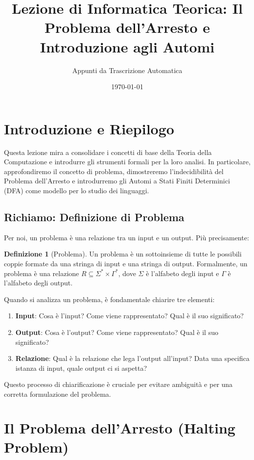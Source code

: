 \documentclass[a4paper]{article}
\title{Lezione di Informatica Teorica: Il Problema dell'Arresto e Introduzione agli Automi}
\author{Appunti da Trascrizione Automatica}
\date{\today}
\theoremstyle{definition} %
\newtheorem{definition}{Definizione}
\begin{document}
\maketitle
\tableofcontents
\newpage

\section{Introduzione e Riepilogo}

Questa lezione mira a consolidare i concetti di base della Teoria della Computazione e introdurre gli strumenti formali per la loro analisi. In particolare, approfondiremo il concetto di problema, dimostreremo l'indecidibilità del Problema dell'Arresto e introdurremo gli Automi a Stati Finiti Determinici (DFA) come modello per lo studio dei linguaggi.

\subsection{Richiamo: Definizione di Problema}

Per noi, un problema è una relazione tra un input e un output. Più precisamente:

\begin{definition}[Problema]
Un problema è un sottoinsieme di tutte le possibili coppie formate da una stringa di input e una stringa di output.
Formalmente, un problema è una relazione $R \subseteq \Sigma^* \times \Gamma^*$, dove $\Sigma$ è l'alfabeto degli input e $\Gamma$ è l'alfabeto degli output.
\end{definition}

Quando si analizza un problema, è fondamentale chiarire tre elementi:
\begin{enumerate}
    \item \textbf{Input}: Cosa è l'input? Come viene rappresentato? Qual è il suo significato?
    \item \textbf{Output}: Cosa è l'output? Come viene rappresentato? Qual è il suo significato?
    \item \textbf{Relazione}: Qual è la relazione che lega l'output all'input? Data una specifica istanza di input, quale output ci si aspetta?
\end{enumerate}
Questo processo di chiarificazione è cruciale per evitare ambiguità e per una corretta formulazione del problema.

\section{Il Problema dell'Arresto (Halting Problem)}
\end{document}
